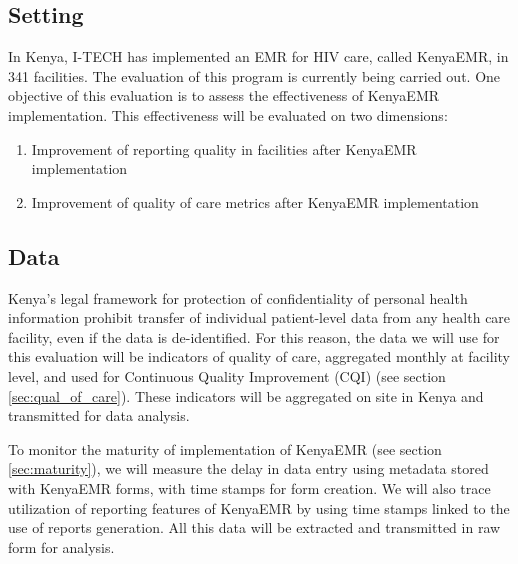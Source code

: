 \subsection{Setting}

In Kenya, I-TECH has implemented an EMR for HIV care, called KenyaEMR, in 341 facilities. The evaluation of this program is currently being carried out. One objective of this evaluation is to assess the effectiveness of KenyaEMR implementation. This effectiveness will be evaluated on two dimensions:

\begin{enumerate}
	\item	Improvement of reporting quality in facilities after KenyaEMR implementation
	\item	Improvement of quality of care metrics after KenyaEMR implementation
\end{enumerate}

\subsection{Data}

Kenya’s legal framework for protection of confidentiality of personal health information prohibit transfer of individual patient-level data from any health care facility, even if the data is de-identified. For this reason, the data we will use for this evaluation will be indicators of quality of care, aggregated monthly at facility level, and used for Continuous Quality Improvement (CQI) (see section \ref{sec:qual_of_care}). These indicators will be aggregated on site in Kenya and transmitted for data analysis.

To monitor the maturity of implementation of KenyaEMR (see section \ref{sec:maturity}), we will measure the delay in data entry using metadata stored with KenyaEMR forms, with time stamps for form creation. We will also trace utilization of reporting features of KenyaEMR by using time stamps linked to the use of reports generation. All this data will be extracted and transmitted in raw form for analysis.

